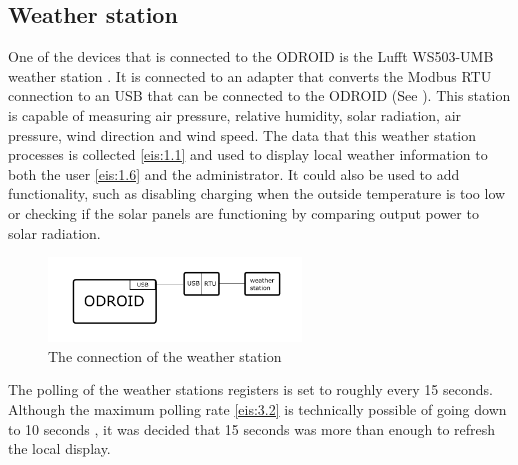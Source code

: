 \subsection{Weather station}\label{sec:weather_station}
One of the devices that is connected to the ODROID is the Lufft WS503-UMB weather station \cite{weatherstation_registers}. It is connected to an adapter that converts the Modbus RTU connection to an USB that can be connected to the ODROID (See ). This station is capable of measuring air pressure, relative humidity, solar radiation, air pressure, wind direction and wind speed. The data that this weather station processes is collected \ref{eis:1.1} and used to display local weather information to both the user \ref{eis:1.6} and the administrator. It could also be used to add functionality, such as disabling charging when the outside temperature is too low \cite{battery_temperature} or checking if the solar panels are functioning by comparing output power to solar radiation.\\

\begin{figure}[!ht]
  \centering
    \includegraphics[width=0.6\textwidth]{images/ODROID_weather_station.pdf}
      \caption{The connection of the weather station}\label{fig:weather_station_connection}
\end{figure}

The polling of the weather stations registers is set to roughly every 15 seconds. Although the maximum polling rate \ref{eis:3.2} is technically possible of going down to 10 seconds \cite{weatherstation_polling_rate}, it was decided that 15 seconds was more than enough to refresh the local display.\\

